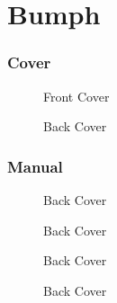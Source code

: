 \chapter{Bumph}

\subsection{Cover}
\begin{figure}[H]
  {
    \begin{adjustbox}{width=10cm,center}
    \end{adjustbox}
  }\caption[]{Front Cover}
\end{figure}

\begin{figure}[H]
  {
    \begin{adjustbox}{width=10cm,center}
    \end{adjustbox}
  }\caption[]{Back Cover}
\end{figure}

\subsection{Manual}

\begin{figure}[H]
  {
    \begin{adjustbox}{width=10cm,center}
    \end{adjustbox}
  }\caption[]{Back Cover}
\end{figure}

\begin{figure}[H]
  {
    \begin{adjustbox}{width=10cm,center}
    \end{adjustbox}
  }\caption[]{Back Cover}
\end{figure}

\begin{figure}[H]
  {
    \begin{adjustbox}{width=10cm,center}
    \end{adjustbox}
  }\caption[]{Back Cover}
\end{figure}

\begin{figure}[H]
  {
    \begin{adjustbox}{width=10cm,center}
    \end{adjustbox}
  }\caption[]{Back Cover}
\end{figure}

